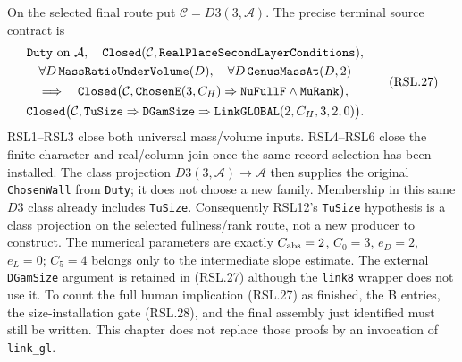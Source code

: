 On the selected final route put $\mathcal C=D3(3,\mathcal A)$.
The precise terminal source contract is
\[
 \begin{gathered}
 \texttt{Duty}\hbox{ on }\mathcal A,\quad
 \texttt{Closed}(\mathcal C,\texttt{RealPlaceSecondLayerConditions}),\\
 \forall D\,\texttt{MassRatioUnderVolume}(D),\quad
 \forall D\,\texttt{GenusMassAt}(D,2)\\
 \Longrightarrow\quad
 \texttt{Closed}\bigl(\mathcal C,
  \texttt{ChosenE}(3,C_H)\Rightarrow
                  \texttt{NuFullF}\wedge\texttt{MuRank}\bigr),\\
 \texttt{Closed}\bigl(\mathcal C,
   \texttt{TuSize}\Rightarrow\texttt{DGamSize}\Rightarrow
                  \texttt{LinkGLOBAL}(2,C_H,3,2,0)\bigr).
 \end{gathered}                                                   \tag{RSL.27}
\]
RSL1--RSL3 close both universal mass/volume inputs.
RSL4--RSL6 close the finite-character and real/column
join once the same-record selection has been installed.
The class projection $D3(3,\mathcal A)\to\mathcal A$
then supplies the original \texttt{ChosenWall} from
\texttt{Duty}; it does not choose a new family.
Membership in this same $D3$ class already includes
\texttt{TuSize}.  Consequently RSL12's \texttt{TuSize}
hypothesis is a class projection on the selected
fullness/rank route, not a new producer to construct.
The numerical parameters are exactly $C_{\rm abs}=2$,
$C_0=3$, $e_D=2$, $e_L=0$; $C_5=4$ belongs only to
the intermediate slope estimate.  The external
\texttt{DGamSize} argument is retained in (RSL.27)
although the \texttt{link8} wrapper does not use it.
To count the full human implication (RSL.27) as finished,
the B entries, the size-installation gate (RSL.28), and the
final assembly just identified
must still be written.  This chapter does not replace
those proofs by an invocation of \texttt{link\_gl}.
